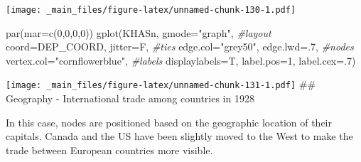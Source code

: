 \documentclass[
  notitlepage,
  onecolumn,
  openany]{book}
\newenvironment{Shaded}{\begin{snugshade}}{\end{snugshade}}
\newcommand{\AttributeTok}[1]{\textcolor[rgb]{0.77,0.63,0.00}{#1}}
\newcommand{\CommentTok}[1]{\textcolor[rgb]{0.56,0.35,0.01}{\textit{#1}}}
\newcommand{\DecValTok}[1]{\textcolor[rgb]{0.00,0.00,0.81}{#1}}
\newcommand{\FunctionTok}[1]{\textcolor[rgb]{0.00,0.00,0.00}{#1}}
\newcommand{\NormalTok}[1]{#1}
\newcommand{\StringTok}[1]{\textcolor[rgb]{0.31,0.60,0.02}{#1}}
\begin{document}
\texttt{[image: \_main\_files/figure-latex/unnamed-chunk-130-1.pdf]}

\begin{Shaded}
\begin{Highlighting}[]
\FunctionTok{par}\NormalTok{(}\AttributeTok{mar=}\FunctionTok{c}\NormalTok{(}\DecValTok{0}\NormalTok{,}\DecValTok{0}\NormalTok{,}\DecValTok{0}\NormalTok{,}\DecValTok{0}\NormalTok{))}
\FunctionTok{gplot}\NormalTok{(KHASn,}
      \AttributeTok{gmode=}\StringTok{"graph"}\NormalTok{,}
      \CommentTok{\#layout}
      \AttributeTok{coord=}\NormalTok{DEP\_COORD,}
      \AttributeTok{jitter=}\NormalTok{F,}
      \CommentTok{\#ties}
      \AttributeTok{edge.col=}\StringTok{"grey50"}\NormalTok{,}
      \AttributeTok{edge.lwd=}\NormalTok{.}\DecValTok{7}\NormalTok{,}
      \CommentTok{\#nodes}
      \AttributeTok{vertex.col=}\StringTok{"cornflowerblue"}\NormalTok{,}
      \CommentTok{\#labels}
      \AttributeTok{displaylabels=}\NormalTok{T, }
      \AttributeTok{label.pos=}\DecValTok{1}\NormalTok{, }
      \AttributeTok{label.cex=}\NormalTok{.}\DecValTok{7}\NormalTok{)}
\end{Highlighting}
\end{Shaded}

\texttt{[image: \_main\_files/figure-latex/unnamed-chunk-131-1.pdf]}
\#\# Geography - International trade among countries in 1928

In this case, nodes are positioned based on the geographic location of their capitals. Canada and the US have been slightly moved to the West to make the trade between European countries more visible.
\end{document}
